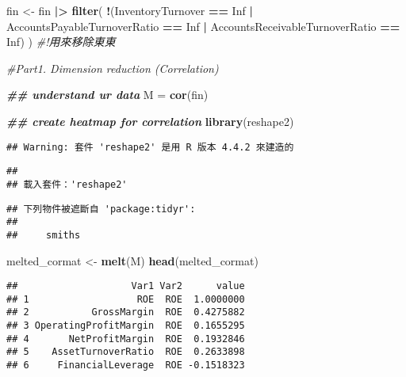 \documentclass[
]{article}
\newenvironment{Shaded}{\begin{snugshade}}{\end{snugshade}}
\newcommand{\CommentTok}[1]{\textcolor[rgb]{0.56,0.35,0.01}{\textit{#1}}}
\newcommand{\ConstantTok}[1]{\textcolor[rgb]{0.56,0.35,0.01}{#1}}
\newcommand{\DocumentationTok}[1]{\textcolor[rgb]{0.56,0.35,0.01}{\textbf{\textit{#1}}}}
\newcommand{\FunctionTok}[1]{\textcolor[rgb]{0.13,0.29,0.53}{\textbf{#1}}}
\newcommand{\NormalTok}[1]{#1}
\newcommand{\OtherTok}[1]{\textcolor[rgb]{0.56,0.35,0.01}{#1}}
\newcommand{\SpecialCharTok}[1]{\textcolor[rgb]{0.81,0.36,0.00}{\textbf{#1}}}
\begin{document}
\begin{Shaded}
\begin{Highlighting}[]
\NormalTok{fin }\OtherTok{\textless{}{-}}\NormalTok{ fin }\SpecialCharTok{|\textgreater{}} 
  \FunctionTok{filter}\NormalTok{(}
    \SpecialCharTok{!}\NormalTok{(InventoryTurnover }\SpecialCharTok{==} \ConstantTok{Inf} \SpecialCharTok{|} 
\NormalTok{        AccountsPayableTurnoverRatio }\SpecialCharTok{==} \ConstantTok{Inf} \SpecialCharTok{|}
\NormalTok{        AccountsReceivableTurnoverRatio }\SpecialCharTok{==} \ConstantTok{Inf}\NormalTok{)}
\NormalTok{  ) }\CommentTok{\#!用來移除東東}
\end{Highlighting}
\end{Shaded}

\begin{Shaded}
\begin{Highlighting}[]
\CommentTok{\#Part1. Dimension reduction (Correlation)}

\DocumentationTok{\#\# understand ur data}
\NormalTok{M }\OtherTok{=} \FunctionTok{cor}\NormalTok{(fin)}

\DocumentationTok{\#\# create heatmap for correlation }
\FunctionTok{library}\NormalTok{(reshape2)}
\end{Highlighting}
\end{Shaded}

\begin{verbatim}
## Warning: 套件 'reshape2' 是用 R 版本 4.4.2 來建造的
\end{verbatim}

\begin{verbatim}
## 
## 載入套件：'reshape2'
\end{verbatim}

\begin{verbatim}
## 下列物件被遮斷自 'package:tidyr':
## 
##     smiths
\end{verbatim}

\begin{Shaded}
\begin{Highlighting}[]
\NormalTok{melted\_cormat }\OtherTok{\textless{}{-}} \FunctionTok{melt}\NormalTok{(M)}
\FunctionTok{head}\NormalTok{(melted\_cormat)}
\end{Highlighting}
\end{Shaded}

\begin{verbatim}
##                    Var1 Var2      value
## 1                   ROE  ROE  1.0000000
## 2           GrossMargin  ROE  0.4275882
## 3 OperatingProfitMargin  ROE  0.1655295
## 4       NetProfitMargin  ROE  0.1932846
## 5    AssetTurnoverRatio  ROE  0.2633898
## 6     FinancialLeverage  ROE -0.1518323
\end{verbatim}
\end{document}
